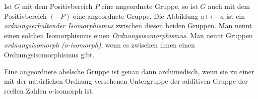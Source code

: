 \begin{defn}\label{ordnungsisomorph}
Ist $G$ mit dem Positivbereich $P$ eine angeordnete Gruppe,
so ist $G$ auch mit dem Positivbereich $\left(−P\right)$ eine angeordnete Gruppe. Die Abbildung
$a \mapsto −a$ ist ein \textit{ordnungserhaltender Isomorphismus} zwischen diesen
beiden Gruppen. Man nennt einen solchen Isomorphismus einen \textit{Ordnungsisomorphismus}.
Man nennt Gruppen \textit{ordnungsisomorph (o-isomorph)}, wenn es zwischen ihnen einen Ordnungsisomorphismus gibt.
\end{defn}
%
\begin{satz}\label{aga} %
Eine angeordnete abelsche Gruppe ist genau dann archimedisch, wenn sie zu einer mit der natürlichen Ordnung versehenen Untergruppe der additiven Gruppe der reellen Zahlen o-isomorph ist.
\end{satz}
%
%

